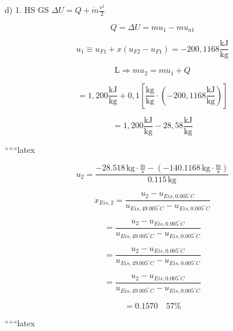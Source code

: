 d) 1. HS GS $\Delta U = Q + \dot{m} \frac{v^2}{2}$

\[
Q = \Delta U = m u_{1} - m u_{a1}
\]

\[
u_{1} \equiv u_{F1} + x (u_{F2} - u_{F1}) = -200,1168 \frac{\text{kJ}}{\text{kg}}
\]

\[
\text{L} \Rightarrow m u_{2} = m u_{1} + Q
\]

\[
= 1,200 \frac{\text{kJ}}{\text{kg}} + 0,1 \left[ \frac{\text{kg}}{\text{kg}} \cdot (-200,1168 \frac{\text{kJ}}{\text{kg}}) \right]
\]

\[
= 1,200 \frac{\text{kJ}}{\text{kg}} - 28,58 \frac{\text{kJ}}{\text{kg}}
\]

``````latex


\[
u_2 = \frac{-28.518 \, \text{kg} \cdot \frac{\text{m}}{\text{s}} - (-140.1168 \, \text{kg} \cdot \frac{\text{m}}{\text{s}})}{0.115 \, \text{kg}}
\]

\[
x_{Eis,2} = \frac{u_2 - u_{Eis,0.005^\circ C}}{u_{Eis,49.005^\circ C} - u_{Eis,0.005^\circ C}}
\]

\[
= \frac{u_2 - u_{Eis,0.005^\circ C}}{u_{Eis,49.005^\circ C} - u_{Eis,0.005^\circ C}}
\]

\[
= \frac{u_2 - u_{Eis,0.005^\circ C}}{u_{Eis,49.005^\circ C} - u_{Eis,0.005^\circ C}}
\]

\[
= \frac{u_2 - u_{Eis,0.005^\circ C}}{u_{Eis,49.005^\circ C} - u_{Eis,0.005^\circ C}}
\]

\[
= 0.1570 \quad \text{57\%}
\]

``````latex